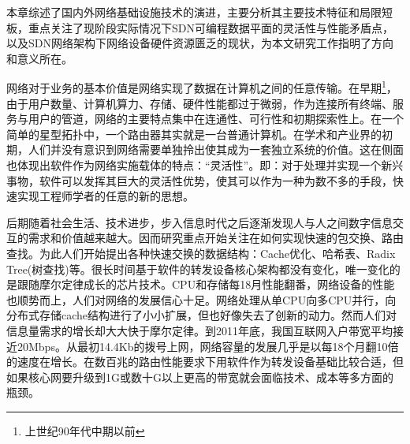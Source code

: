 
\label{sec:pdpintro}











本章综述了国内外网络基础设施技术的演进，主要分析其主要技术特征和局限短板，重点关注了现阶段实际情况下SDN可编程数据平面的灵活性与性能矛盾点，以及SDN网络架构下网络设备硬件资源匮乏的现状，为本文研究工作指明了方向和意义所在。














网络对于业务的基本价值是网络实现了数据在计算机之间的任意传输。在早期\footnote{上世纪90年代中期以前}，由于用户数量、计算机算力、存储、硬件性能都过于微弱，作为连接所有终端、服务与用户的管道，网络的主要特点集中在连通性、可行性和初期探索性上。在一个简单的星型拓扑中，一个路由器其实就是一台普通计算机。在学术和产业界的初期，人们并没有意识到网络需要单独拎出使其成为一套独立系统的价值。这在侧面也体现出软件作为网络实施载体的特点：“灵活性”。即：对于处理并实现一个新兴事物，软件可以发挥其巨大的灵活性优势，使其可以作为一种为数不多的手段，快速实现工程师学者的任意的新的思想。

后期随着社会生活、技术进步，步入信息时代之后逐渐发现人与人之间数字信息交互的需求和价值越来越大。因而研究重点开始关注在如何实现快速的包交换、路由查找。为此人们开始提出各种快速交换的数据结构：Cache优化、哈希表、Radix Tree(树查找)等。很长时间基于软件的转发设备核心架构都没有变化，唯一变化的是跟随摩尔定律成长的芯片技术。CPU和存储每18月性能翻番，网络设备的性能也顺势而上，人们对网络的发展信心十足。网络处理从单CPU向多CPU并行，向分布式存储cache结构进行了小小扩展，但也好像失去了创新的动力。然而人们对信息量需求的增长却大大快于摩尔定律。到2011年底，我国互联网入户带宽平均接近20Mbps。从最初14.4Kb的拨号上网，网络容量的发展几乎是以每18个月翻10倍的速度在增长。在数百兆的路由性能要求下用软件作为转发设备基础比较合适，但如果核心网要升级到1G或数十G以上更高的带宽就会面临技术、成本等多方面的瓶颈。

